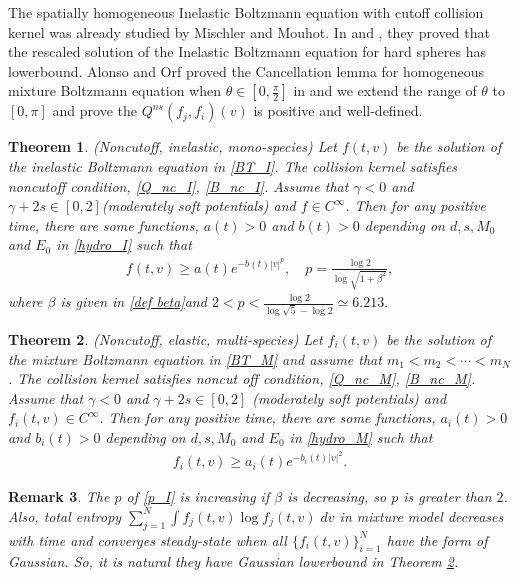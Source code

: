 \documentclass[reqno,10pt]{amsart}
\newtheorem{theorem}{Theorem}[section]
\newtheorem{remark}[theorem]{Remark}
\numberwithin{equation}{section}
\begin{document}
The spatially homogeneous Inelastic Boltzmann equation with cutoff collision kernel was already studied by Mischler and Mouhot. In \cite{SC2006} and \cite{SC2009}, they proved that the rescaled solution of the Inelastic Boltzmann equation for hard spheres has lowerbound. Alonso and Orf proved the Cancellation lemma for homogeneous mixture Boltzmann equation when $\theta \in [0, \frac{\pi}{2}]$ in \cite{AO2022} and we extend the range of $\theta$ to $[0,\pi]$ and prove the $Q^{ns}(f_j,f_i)(v)$ is positive and well-defined.  \\

\begin{theorem} (Noncutoff, inelastic, mono-species) \label{1.1}
 Let $f(t,v)$ be the solution of the inelastic Boltzmann equation in \eqref{BT_I}. The collision kernel satisfies noncutoff condition, \eqref{Q_nc_I}, \eqref{B_nc_I}. Assume that $\gamma<0$ and $\gamma+2s \in [0,2]$(moderately soft potentials) and $f \in C^{\infty}$.
Then for any positive time, there are some functions,  $a(t)>0$ and $b(t)>0$ depending on $d,s,M_0$ and $E_0$ in \eqref{hydro_I} such that 
\begin{align} \label{p_I}
    f(t,v) \geq a(t) e^{-b(t)|v|^p}, \quad p =\frac{\log2}{\log\sqrt{1+\beta^2}}, 
\end{align} where $\beta$ is given in \eqref{def beta}\;and\; $2< p < \frac{\log2}{\log\sqrt{5}-\log 2} \simeq  6.213.$ 
\end{theorem} 

\begin{theorem} (Noncutoff, elastic, multi-species) \label{1.2}
Let $f_i(t,v)$ be the solution of the mixture Boltzmann equation in \eqref{BT_M} and assume that $m_1<m_2< \cdots <m_N$. The collision kernel satisfies noncut off condition, \eqref{Q_nc_M}, \eqref{B_nc_M}. Assume that $\gamma<0$ and $\gamma+2s \in [0,2]$ (moderately soft potentials) and $f_i(t,v) \in C^{\infty}$. Then for any positive time, there are some functions, $a_i(t)>0$ and $b_i(t)>0$ depending on $d,s,M_0$ and $E_0$ in \eqref{hydro_M} such that 
\begin{align} \label{p_M}
    f_i(t,v) \geq a_i(t) e^{-b_i(t)|v|^{2}}. 
\end{align} 
\end{theorem} 

\begin{remark}
The $p$ of \eqref{p_I} is increasing if $\beta$ is decreasing, so $p$ is greater than $2$. Also, total entropy $\sum_{j=1}^{N} \int f_j(t,v)\log f_j(t,v)\; dv$ in mixture model decreases with time and converges steady-state when all $\{f_i(t,v)\}_{i=1}^{N}$ have the form of Gaussian. So, it is natural they have Gaussian lowerbound in Theorem \ref{1.2}. \\
\end{remark} 
\end{document}
